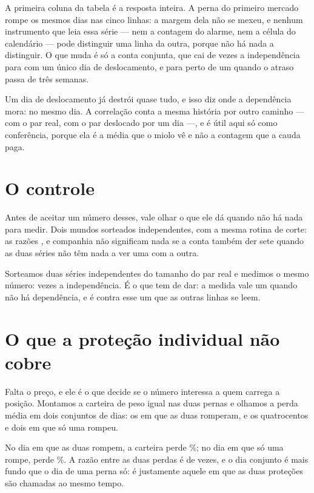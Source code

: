 A primeira coluna da tabela é a resposta inteira. A perna do primeiro mercado rompe os mesmos
\numDependenciaRompeA{} dias nas cinco linhas: a margem dela não se mexeu, e nenhum instrumento
que leia essa série --- nem a contagem do alarme, nem a célula do calendário --- pode
distinguir uma linha da outra, porque não há nada a distinguir. O que muda é só a conta
conjunta, que cai de \numDependenciaExcesso{} vezes a independência para
\numDependenciaAtrasoUmDiaExcesso{} com um único dia de deslocamento, e para perto de um quando
o atraso passa de três semanas.

Um dia de deslocamento já destrói quase tudo, e isso diz onde a dependência mora: no mesmo dia.
A correlação conta a mesma história por outro caminho --- \numDependenciaCorrelacao{} com o par
real, \numDependenciaAtrasoUmDiaCorrelacao{} com o par deslocado por um dia ---, e é útil aqui
só como conferência, porque ela é a média que o miolo vê e não a contagem que a cauda paga.

\section{O controle}

Antes de aceitar um número desses, vale olhar o que ele dá quando não há nada para medir. Dois
mundos sorteados independentes, com a mesma rotina de corte: as razões
\numDependenciaExcesso{}, \numDependenciaAtrasoUmDiaExcesso{} e companhia não significam nada se
a conta também der sete quando as duas séries não têm nada a ver uma com a outra.

Sorteamos duas séries independentes do tamanho do par real e medimos o mesmo número: \numDependenciaControleExcesso{} vezes a independência. É o que tem de dar: a medida vale um
quando não há dependência, e é contra esse um que as outras linhas se leem.

\section{O que a proteção individual não cobre}

Falta o preço, e ele é o que decide se o número interessa a quem carrega a posição. Montamos a
carteira de peso igual nas duas pernas e olhamos a perda média em dois conjuntos de dias: os
\numDependenciaJuntos{} em que as duas romperam, e os quatrocentos e dois em que só uma rompeu.

No dia em que as duas rompem, a carteira perde \numDependenciaPerdaJuntosPct\%; no dia em que só
uma rompe, perde \numDependenciaPerdaUmaPernaPct\%. A razão entre as duas perdas é de \numDependenciaPerdaRazao{} vezes, e o dia conjunto é mais fundo que o dia de uma perna só: é justamente aquele em que as duas proteções são chamadas ao mesmo tempo.

